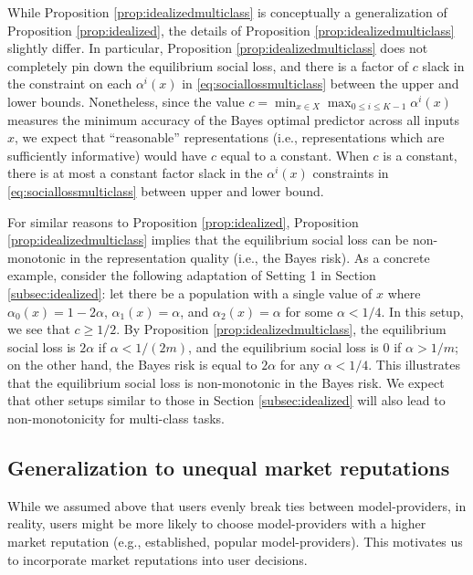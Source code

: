 \documentclass[letterpaper,11pt]{article}
\theoremstyle{plain}
\begin{document}
While Proposition \ref{prop:idealizedmulticlass} is conceptually a generalization of Proposition \ref{prop:idealized}, the details of Proposition \ref{prop:idealizedmulticlass} slightly differ. In particular, Proposition \ref{prop:idealizedmulticlass} does not completely pin down the equilibrium social loss, and there is a factor of $c$ slack in the constraint on each $\alpha^i(x)$ in \eqref{eq:sociallossmulticlass} between the upper and lower bounds. Nonetheless, since the value $c = \min_{x \in X} \max_{0 \le i \le K-1} \alpha^i(x)$ measures the minimum accuracy of the Bayes optimal predictor across all inputs $x$, we expect that ``reasonable'' representations (i.e., representations which are sufficiently informative) would have $c$ equal to a constant. When $c$ is a constant, there is at most a constant factor slack in the $\alpha^i(x)$ constraints in \eqref{eq:sociallossmulticlass} between upper and lower bound. 

For similar reasons to Proposition \ref{prop:idealized}, Proposition \ref{prop:idealizedmulticlass}  implies that the equilibrium social loss can be non-monotonic in the representation quality (i.e., the Bayes risk). As a concrete example, consider the following adaptation of Setting 1 in Section \ref{subsec:idealized}: let there be a population with a single value of $x$ where $\alpha_0(x) = 1 - 2\alpha$, $\alpha_1(x) = \alpha$, and $\alpha_2(x) = \alpha$ for some $\alpha < 1/4$. In this setup, we see that $c \ge 1/2$. By Proposition \ref{prop:idealizedmulticlass}, the equilibrium social loss is $2 \alpha$ if $\alpha < 1/(2m)$, and the equilibrium social loss is $0$ if $\alpha > 1/m$; on the other hand, the Bayes risk is equal to $2 \alpha$ for any $\alpha < 1/4$. This illustrates that the equilibrium social loss is non-monotonic in the Bayes risk. We expect that other setups similar to those in Section \ref{subsec:idealized} will also lead to non-monotonicity for multi-class tasks. 


\subsection{Generalization to unequal market reputations}\label{subsec:unequal}
While we assumed above that users evenly break ties between model-providers, in reality, users might be more likely to choose model-providers with a higher market reputation (e.g., established, popular model-providers). This motivates us to incorporate market reputations into user decisions. 
\end{document}
